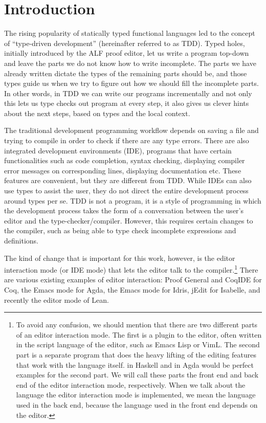 \section{Introduction} \label{sec:introduction}

The rising popularity of statically typed functional languages led to
the concept of ``type-driven development'' (hereinafter referred to as TDD).
Typed holes, initially introduced by the ALF proof editor\cite{ALF}, let us
write a program top-down and leave the parts we do not know how to write
incomplete. The parts we have already written dictate the types of the
remaining parts should be, and those types guide us when we try to figure out
how we should fill the incomplete parts.
In other words, in TDD we can write our programs incrementally and not only
this lets us type checks out program at every step, it also gives us clever
hints about the next steps, based on types and the local context.

The traditional development programming workflow depends on saving a
file and trying to compile in order to check if there are any type
errors. There are also integrated development environments (IDE),
programs that have certain functionalities such as code completion, syntax
checking, displaying compiler error messages on corresponding lines, displaying
documentation etc. These features are convenient, but they are different from
TDD. While IDEs can also use types to assist the user, they do not direct the
entire development process around types per se. TDD is not a program, it is a
style of programming in which the development process takes the form of a
conversation between the user's editor and the type-checker/compiler. However,
this requires certain changes to the compiler, such as being able to type check
incomplete expressions and definitions.\cite{tdd}

The kind of change that is important for this work, however, is the editor
interaction mode (or IDE mode) that lets the editor
talk to the compiler.\footnote{To avoid any confusion, we should mention that
  there are two different parts of an editor interaction mode. The first is a
  plugin to the editor, often written in the script language of the editor,
  such as Emacs Lisp or VimL. The second part is a separate program that does
  the heavy lifting of the editing features that work with the language
  itself.   in Haskell and  in Agda would be
  perfect examples for the second part. We will call these parts the front
  end and back end of the editor interaction mode, respectively.
  When we talk about the language the editor interaction mode is implemented,
  we mean the language used in the back end, because the language used in the
  front end depends on the editor.}
There are various existing examples of editor interaction:
Proof General\cite{pg} and CoqIDE for Coq\cite{coq},
the Emacs mode\cite{agdamode} for Agda\cite{agda},
the Emacs mode\cite{idrismode} for Idris\cite{idris},
jEdit\cite{isabellejedit} for Isabelle\cite{isabelle},
and recently the editor mode of Lean\cite{lean}.

